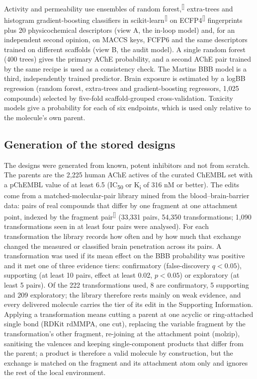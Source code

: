 \documentclass[11pt,a4paper]{article}
\renewcommand{\cite}[1]{\textsuperscript{[\citenum{#1}]}}
\begin{document}
Activity and permeability use ensembles of random forest,\cite{rf} extra-trees and histogram gradient-boosting classifiers in scikit-learn\cite{sklearn} on ECFP4\cite{ecfp} fingerprints plus 20 physicochemical descriptors (view A, the in-loop model) and, for an independent second opinion, on MACCS keys, FCFP6 and the same descriptors trained on different scaffolds (view B, the audit model). A single random forest (400 trees) gives the primary AChE probability, and a second AChE pair trained by the same recipe is used as a consistency check. The Martins BBB model is a third, independently trained predictor. Brain exposure is estimated by a logBB regression (random forest, extra-trees and gradient-boosting regressors, 1,025 compounds) selected by five-fold scaffold-grouped cross-validation. Toxicity models give a probability for each of six endpoints, which is used only relative to the molecule's own parent.

\subsection{Generation of the stored designs}
\label{sec:generation}

The designs were generated from known, potent inhibitors and not from scratch. The parents are the 2,225 human AChE actives of the curated ChEMBL set with a pChEMBL value of at least 6.5 (IC\textsubscript{50} or K\textsubscript{i} of 316 nM or better). The edits come from a matched-molecular-pair library mined from the blood--brain-barrier data: pairs of real compounds that differ by one fragment at one attachment point, indexed by the fragment pair\cite{hr} (33,331 pairs, 54,350 transformations; 1,090 transformations seen in at least four pairs were analysed). For each transformation the library records how often and by how much that exchange changed the measured or classified brain penetration across its pairs. A transformation was used if its mean effect on the BBB probability was positive and it met one of three evidence tiers: confirmatory (false-discovery $q<0.05$), supporting (at least 10 pairs, effect at least 0.02, $p<0.05$) or exploratory (at least 5 pairs). Of the 222 transformations used, 8 are confirmatory, 5 supporting and 209 exploratory; the library therefore rests mainly on weak evidence, and every delivered molecule carries the tier of its edit in the Supporting Information. Applying a transformation means cutting a parent at one acyclic or ring-attached single bond (RDKit rdMMPA, one cut), replacing the variable fragment by the transformation's other fragment, re-joining at the attachment point (molzip), sanitising the valences and keeping single-component products that differ from the parent; a product is therefore a valid molecule by construction, but the exchange is matched on the fragment and its attachment atom only and ignores the rest of the local environment.
\end{document}
